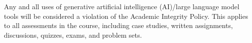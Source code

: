 Any and all uses of generative artificial intelligence (AI)/large language model
tools will be considered a violation of the Academic Integrity Policy. This
applies to all assessments in the course, including case studies, written
assignments, discussions, quizzes, exams, and problem sets.
